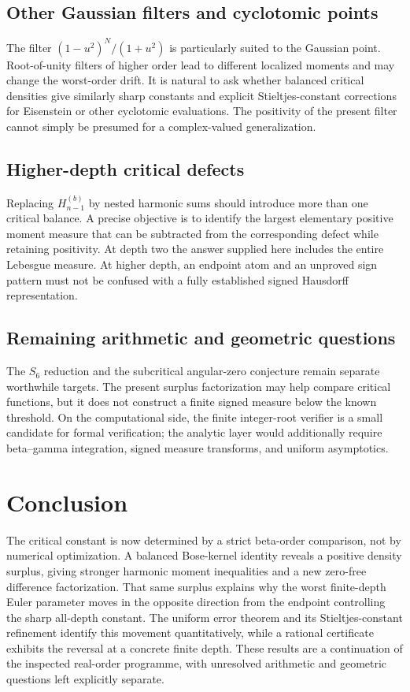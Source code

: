 \documentclass[11pt]{article}
\numberwithin{equation}{section}
\theoremstyle{definition}\newtheorem{definition}[theorem]{Definition}
\theoremstyle{remark}\newtheorem{remark}[theorem]{Remark}
\begin{document}
\subsection{Other Gaussian filters and cyclotomic points}
The filter $(1-u^2)^N/(1+u^2)$ is particularly suited to the Gaussian
point. Root-of-unity filters of higher order lead to different localized
moments and may change the worst-order drift. It is natural to ask
whether balanced critical densities give similarly sharp constants and
explicit Stieltjes-constant corrections for Eisenstein or other
cyclotomic evaluations. The positivity of the present filter cannot
simply be presumed for a complex-valued generalization.

\subsection{Higher-depth critical defects}
Replacing $H_{n-1}^{(b)}$ by nested harmonic sums should introduce more
than one critical balance. A precise objective is to identify the
largest elementary positive moment measure that can be subtracted from
the corresponding defect while retaining positivity. At depth two the
answer supplied here includes the entire Lebesgue measure. At higher
depth, an endpoint atom and an unproved sign pattern must not be
confused with a fully established signed Hausdorff representation.

\subsection{Remaining arithmetic and geometric questions}
The $S_6$ reduction and the subcritical angular-zero conjecture remain
separate worthwhile targets. The present surplus factorization may
help compare critical functions, but it does not construct a finite
signed measure below the known threshold. On the computational side,
the finite integer-root verifier is a small candidate for formal
verification; the analytic layer would additionally require beta--gamma
integration, signed measure transforms, and uniform asymptotics.

\section*{Conclusion}
The critical constant is now determined by a strict beta-order comparison,
not by numerical optimization. A balanced Bose-kernel identity reveals a
positive density surplus, giving stronger harmonic moment inequalities
and a new zero-free difference factorization. That same surplus explains
why the worst finite-depth Euler parameter moves in the opposite
direction from the endpoint controlling the sharp all-depth constant.
The uniform error theorem and its Stieltjes-constant refinement identify
this movement quantitatively, while a rational certificate exhibits the
reversal at a concrete finite depth. These results are a continuation of
the inspected real-order programme, with unresolved arithmetic and
geometric questions left explicitly separate.
\end{document}
